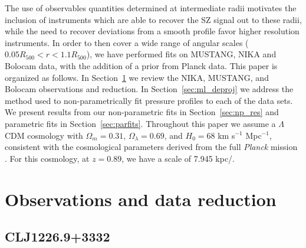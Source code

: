 \documentclass[onecolumn,traditabstract]{aa}
\begin{document}
The use of observables quantities determined at intermediate radii motivates the inclusion of instruments which are able
to recover the SZ signal out to these radii, while the need to recover deviations from a smooth profile favor higher
resolution instruments. In order to then cover a wide range of angular scales ($0.05 R_{500} < r < 1.1 R_{500}$), we have
performed fits on MUSTANG, NIKA and Bolocam data, with the addition of a prior from Planck data.
This paper is organized as follows. In Section~\ref{sec:obs} we review the NIKA, MUSTANG, and Bolocam observations and reduction. 
In Section~\ref{sec:ml_deproj} we address the method used to non-parametrically fit pressure profiles to each of the data sets.
We present results from our non-parametric fits in Section~\ref{sec:np_res} and parametric fits in Section~\ref{sec:parfits}. 
Throughout this paper we assume a $\Lambda$CDM cosmology with $\Omega_m = 0.31$, $\Omega_{\lambda} = 0.69$, and $H_0 = 68$ 
km s$^{-1}$ Mpc$^{-1}$, consistent with the cosmological parameters derived from the full \emph{Planck} mission
\citep{planck2016_cp}. For this cosmology, at $z=0.89$, we have a scale of 7.945 kpc/\asec.

\section{Observations and data reduction}
\label{sec:obs}

\subsection{CLJ1226.9+3332}
\label{sec:sample_clj1227}
\end{document}
